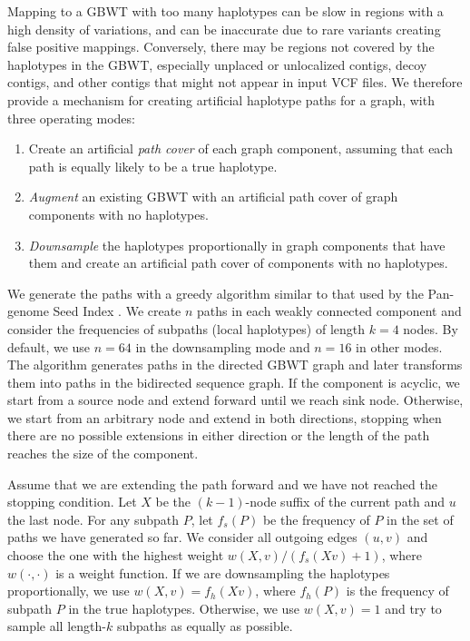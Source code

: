 \documentclass[11pt]{ucscthesis}
\newcommand{\vocab}[1]{\emph{#1}}
\begin{document}
Mapping to a GBWT with too many haplotypes can be slow in regions with a high density of variations, and can be inaccurate due to rare variants creating false positive mappings.
Conversely, there may be regions not covered by the haplotypes in the GBWT, especially unplaced or unlocalized contigs, decoy contigs, and other contigs that might not appear in input VCF files.
We therefore provide a mechanism for creating artificial haplotype paths for a graph, with three operating modes:
\begin{enumerate}
    \item Create an artificial \vocab{path cover} of each graph component, assuming that each path is equally likely to be a true haplotype.
    \item \vocab{Augment} an existing GBWT with an artificial path cover of graph components with no haplotypes.
    \item \vocab{Downsample} the haplotypes proportionally in graph components that have them and create an artificial path cover of components with no haplotypes.
\end{enumerate}

We generate the paths with a greedy algorithm similar to that used by the Pan-genome Seed Index \cite{Ghaffaari2019}.
We create $n$ paths in each weakly connected component and consider the frequencies of subpaths (local haplotypes) of length $k = 4$ nodes.
By default, we use $n = 64$ in the downsampling mode and $n = 16$ in other modes.
The algorithm generates paths in the directed GBWT graph and later transforms them into paths in the bidirected sequence graph.
If the component is acyclic, we start from a source node and extend forward until we reach sink node.
Otherwise, we start from an arbitrary node and extend in both directions, stopping when there are no possible extensions in either direction or the length of the path reaches the size of the component.

Assume that we are extending the path forward and we have not reached the stopping condition.
Let $X$ be the $(k-1)$-node suffix of the current path and $u$ the last node.
For any subpath $P$, let $f_{s}(P)$ be the frequency of $P$ in the set of paths we have generated so far.
We consider all outgoing edges $(u, v)$ and choose the one with the highest weight $w(X, v) / (f_{s}(Xv) + 1)$, where $w(\cdot, \cdot)$ is a weight function.
If we are downsampling the haplotypes proportionally, we use $w(X, v) = f_{h}(Xv)$, where $f_{h}(P)$ is the frequency of subpath $P$ in the true haplotypes.
Otherwise, we use $w(X, v) = 1$ and try to sample all length-$k$ subpaths as equally as possible.
\end{document}
